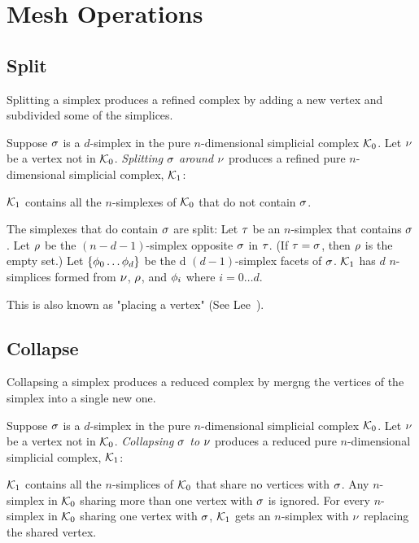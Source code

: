 
\section{Mesh Operations}
\label{sec:mesh-operations}

\subsection{Split}

Splitting a simplex produces a refined complex by adding a new vertex
and subdivided some of the simplices.


Suppose $\sigma$ is a $d$-simplex
in the pure $n$-dimensional simplicial complex $\mathcal{K}_0$.
Let $\nu$ be a vertex not in $\mathcal{K}_0$.
{\it Splitting $\sigma$ around $\nu$}
produces a refined pure $n$-dimensional simplicial complex, $\mathcal{K}_1$:

$\mathcal{K}_1$ contains all the  $n$-simplexes of $\mathcal{K}_0$
that do not contain $\sigma$.

The simplexes that do contain $\sigma$ are split:
Let $\tau$ be an $n$-simplex that contains $\sigma$.
Let $\rho$ be the $(n-d-1)$-simplex opposite $\sigma$
in $\tau$.
(If $\tau = \sigma$, then $\rho$ is the empty set.)
Let $\{ \phi_0 \ldots \phi_d \}$ be the
d $(d-1)$-simplex facets of $\sigma$.
$\mathcal{K}_1$ has
$d$ $n$-simplices formed from
$\nu$, $\rho$, and
$\phi_i$ where $i=0 \ldots d$.

This is also known as "placing a vertex" 
(See Lee~\cite[sec.~17.2]{lee-hdcg-17-2004}).

\subsection{Collapse}

Collapsing a simplex produces a reduced complex by mergng
the vertices of the simplex into a single new one.

Suppose $\sigma$ is a $d$-simplex
in the pure $n$-dimensional simplicial complex $\mathcal{K}_0$.
Let $\nu$ be a vertex not in $\mathcal{K}_0$.
{\it Collapsing $\sigma$ to $\nu$}
produces a reduced pure $n$-dimensional simplicial complex, $\mathcal{K}_1$:

$\mathcal{K}_1$ contains all the
$n$-simplices of $\mathcal{K}_0$ that share no vertices with $\sigma$.
Any $n$-simplex in $\mathcal{K}_0$ sharing more than one vertex
with $\sigma$ is ignored.
For every $n$-simplex in $\mathcal{K}_0$ sharing one vertex with $\sigma$,
$\mathcal{K}_1$ gets an $n$-simplex with $\nu$ replacing the
shared vertex.

